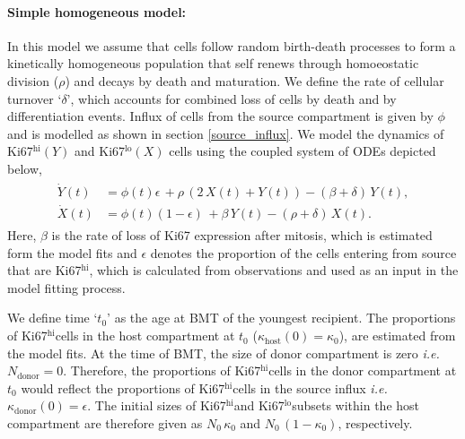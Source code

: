 \documentclass[11pt]{article}
\newcommand{\bea}{\begin{eqnarray}}
\newcommand{\eea}{\end{eqnarray}}
\newcommand{\ie}{\textit{i.e.}}
\newcommand{\khi}{Ki67$^\text{hi}$}
\newcommand{\klo}{Ki67$^\text{lo}$}
\begin{document}
\paragraph*{Simple homogeneous model:}
In this model we assume that cells follow random birth-death processes to form a kinetically homogeneous population that self renews through homoeostatic division ($\rho$) and decays by death and maturation. 
We define the rate of cellular turnover `$\delta$', which accounts for combined loss of cells by death and by differentiation events.  
Influx of cells from the source compartment is given by $\phi$ and is modelled as shown in section \ref{source_influx}. 
We model the dynamics of \khi $(Y)$ and \klo $(X)$ cells using the coupled system of ODEs depicted below,
\bea
\begin{aligned}
\dot Y(t) &= \phi(t) \epsilon \, + \rho \,(2 \, X(t) + Y(t)) - (\beta + \delta) \, Y(t),\\
\dot X(t) &= \phi(t) (1-\epsilon) \, + \beta  \, Y(t) - (\rho + \delta) \, X(t).
\label{eq:SHM}
\end{aligned}
\eea
Here, $\beta$ is the rate of loss of Ki67 expression after mitosis, which is estimated form the model fits and $\epsilon$ denotes the proportion of the cells entering from source that are \khi, which is calculated from observations and used as an input in the model fitting process.

We define time `$t_0$' as the age at BMT of the youngest recipient.
The proportions of \khi cells in the host compartment at $t_0$ \big($\kappa_{\text{host}}(0) = \kappa_0$\big), are estimated from the model fits. 
At the time of BMT, the size of donor compartment is zero \ie $N_{\text{donor}} = 0$.
Therefore, the proportions of \khi cells in the donor compartment at $t_0$ would reflect the proportions of \khi cells in the source influx \ie \, $\kappa_{\text{donor}}(0) = \epsilon$. 
The initial sizes of \khi and \klo subsets within the host compartment are therefore given as $N_0 \, \kappa_0$ and $N_0 \, (1 - \kappa_0)$, respectively. 
\end{document}
